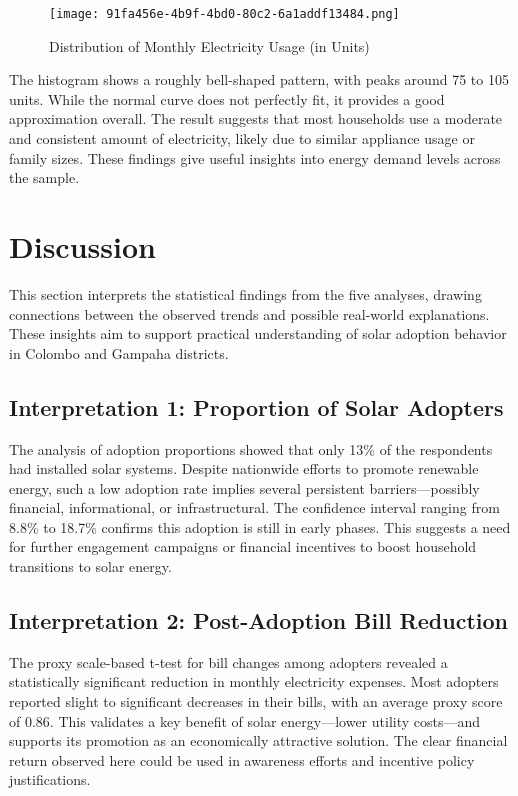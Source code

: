 \documentclass[12pt,a4paper]{article}
\begin{document}
\begin{figure}[H]
\centering
\texttt{[image: 91fa456e-4b9f-4bd0-80c2-6a1addf13484.png]}
\caption{Distribution of Monthly Electricity Usage (in Units)}
\end{figure}

The histogram shows a roughly bell-shaped pattern, with peaks around 75 to 105 units. While the normal curve does not perfectly fit, it provides a good approximation overall. The result suggests that most households use a moderate and consistent amount of electricity, likely due to similar appliance usage or family sizes. These findings give useful insights into energy demand levels across the sample.



\section{Discussion}

This section interprets the statistical findings from the five analyses, drawing connections between the observed trends and possible real-world explanations. These insights aim to support practical understanding of solar adoption behavior in Colombo and Gampaha districts.

\subsection*{Interpretation 1: Proportion of Solar Adopters}

The analysis of adoption proportions showed that only 13\% of the respondents had installed solar systems. Despite nationwide efforts to promote renewable energy, such a low adoption rate implies several persistent barriers—possibly financial, informational, or infrastructural. The confidence interval ranging from 8.8\% to 18.7\% confirms this adoption is still in early phases. This suggests a need for further engagement campaigns or financial incentives to boost household transitions to solar energy.

\subsection*{Interpretation 2: Post-Adoption Bill Reduction}

The proxy scale-based t-test for bill changes among adopters revealed a statistically significant reduction in monthly electricity expenses. Most adopters reported slight to significant decreases in their bills, with an average proxy score of 0.86. This validates a key benefit of solar energy—lower utility costs—and supports its promotion as an economically attractive solution. The clear financial return observed here could be used in awareness efforts and incentive policy justifications.
\end{document}
